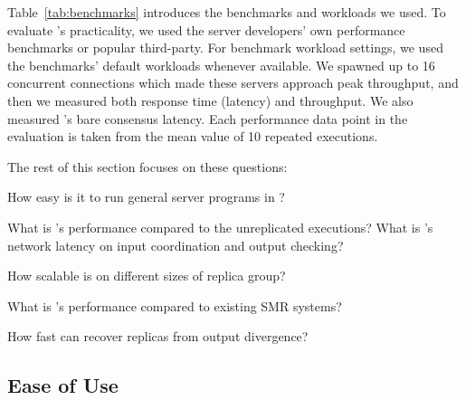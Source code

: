 Table~\ref{tab:benchmarks} introduces the benchmarks and workloads we used. To 
evaluate \xxx's practicality, we used the server developers' own performance 
benchmarks or popular third-party. For benchmark workload settings, we used the 
benchmarks' default workloads whenever available. We spawned 
up to 16 concurrent connections which made these servers approach peak 
throughput, and then we measured both response time (latency) and throughput. We 
also measured \xxx's bare consensus latency. Each performance data point in the 
evaluation is taken from the mean value of 10 repeated executions.

The rest of this section focuses on these questions:

\begin{tightenum}

\item[\S\ref{sec:ease-of-use}:] How easy is it to run general server programs 
in \xxx?

\item[\S\ref{sec:overhead}:] What is \xxx's performance compared to the 
unreplicated executions? What is \xxx's network latency on input coordination 
and output checking?

\item[\S\ref{sec:scalability}:] How scalable is \xxx on different sizes of 
replica group?

\item[\S\ref{sec:compare}:] What is \xxx's performance compared to existing 
SMR systems?

\item[\S\ref{sec:robust}:] How fast can \xxx recover replicas from output 
divergence?



\end{tightenum}

\subsection{Ease of Use} \label{sec:ease-of-use}

